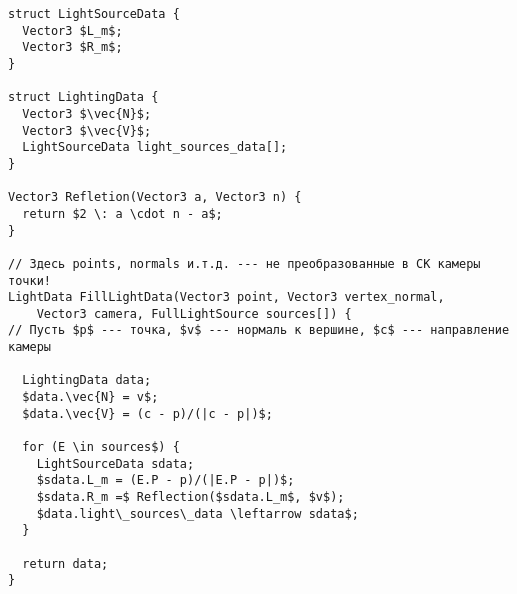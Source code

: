 \documentclass[a4paper,12pt]{report}
\numberwithin{equation}{section}
\begin{document}
\begin{lstlisting}[float=!h,caption={Нахождение векторов для освещения по Фонгу},label=lighting_vectors_algo]
struct LightSourceData {
  Vector3 $L_m$;
  Vector3 $R_m$;
}

struct LightingData {
  Vector3 $\vec{N}$;
  Vector3 $\vec{V}$;
  LightSourceData light_sources_data[];
}

Vector3 Refletion(Vector3 a, Vector3 n) {
  return $2 \: a \cdot n - a$;
}

// Здесь points, normals и.т.д. --- не преобразованные в СК камеры точки!
LightData FillLightData(Vector3 point, Vector3 vertex_normal,
    Vector3 camera, FullLightSource sources[]) {
// Пусть $p$ --- точка, $v$ --- нормаль к вершине, $c$ --- направление камеры

  LightingData data;
  $data.\vec{N} = v$;
  $data.\vec{V} = (c - p)/(|c - p|)$;
  
  for (E \in sources$) {
    LightSourceData sdata;
    $sdata.L_m = (E.P - p)/(|E.P - p|)$;
    $sdata.R_m =$ Reflection($sdata.L_m$, $v$);
    $data.light\_sources\_data \leftarrow sdata$;
  }
  
  return data;
}
\end{lstlisting}
\end{document}
